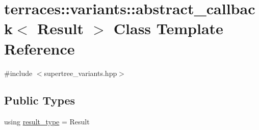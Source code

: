 \hypertarget{classterraces_1_1variants_1_1abstract__callback}{}\section{terraces\+:\+:variants\+:\+:abstract\+\_\+callback$<$ Result $>$ Class Template Reference}
\label{classterraces_1_1variants_1_1abstract__callback}


{\ttfamily \#include $<$supertree\+\_\+variants.\+hpp$>$}

\subsection*{Public Types}
\begin{DoxyCompactItemize}
\item 
using \hyperlink{classterraces_1_1variants_1_1abstract__callback_ac1da94f0be306068e89627dc40cd0f3b}{result\+\_\+type} = Result
\end{DoxyCompactItemize}
